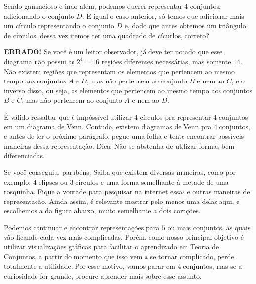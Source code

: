 
  Sendo ganancioso e indo além, podemos querer representar $4$ conjuntos, adicionando o conjunto $D$. E igual o caso anterior, só temos que adicionar mais um círculo representando o conjunto $D$ e, dado que antes obtemos um triângulo de círculos, dessa vez iremos ter uma quadrado de cícurlos, correto?

  \textbf{ERRADO!} Se você é um leitor observador, já deve ter notado que esse diagrama não possui as $2^4=16$ regiões diferentes necessárias, mas somente $14$. Não existem regiões que representam os elementos que pertencem ao mesmo tempo aos conjuntos $A$ e $D$, mas não pertencem ao conjunto $B$ e nem ao $C$, e o inverso disso, ou seja, os elementos que pertencem ao mesmo tempo aos conjuntos $B$ e $C$, mas não pertencem ao conjunto $A$ e nem ao $D$.

  É válido ressaltar que é impóssível utilizar $4$ círculos pra representar $4$ conjuntos em um diagrama de Venn. Contudo, existem diagramas de Venn pra $4$ conjuntos, e antes de ler o próximo parágrafo, pegue uma folha e tente encontrar possíveis maneiras dessa representação. Dica: Não se abstenha de utilizar formas bem diferenciadas.

  Se você conseguiu, parabéns. Saiba que existem diversas maneiras, como por exemplo: $4$ elipses ou $3$ círculos e uma forma semelhante à metade de uma rosquinha. Fique a vontade para pesquisar na internet essas e outras maneiras de representação. Ainda assim, é relevante mostrar pelo menos uma delas aqui, e escolhemos a da figura abaixo, muito semelhante a dois corações.


  Podemos continuar e encontrar representações para $5$ ou mais conjuntos, as quais vão ficando cada vez mais complicadas. Porém, como nosso principal objetivo é utilizar visualizações gráficas para facilitar o aprendizado em Teoria de Conjuntos, a partir do momento que isso vem a se tornar complicado, perde totalmente a utilidade. Por esse motivo, vamos parar em $4$ conjuntos, mas se a curiosidade for grande, procure aprender mais sobre esse assunto.

